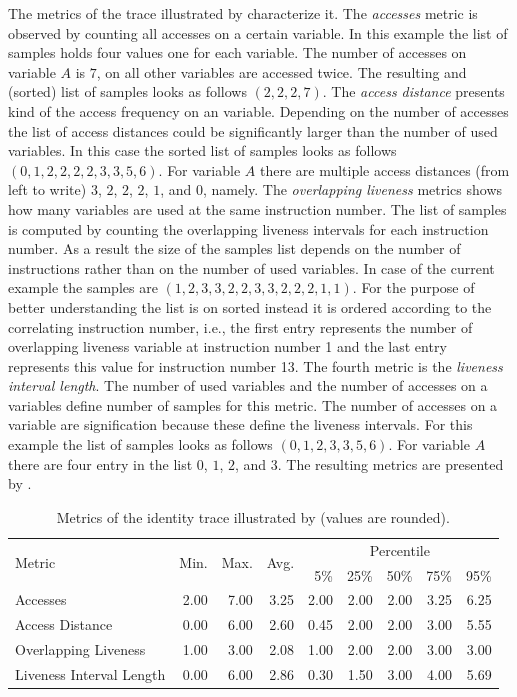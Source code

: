 \documentclass[onecolumn, openright, master, english, signatures]{dbrgrptt}
\begin{document}
The metrics of the \ac{trace} illustrated by  characterize it. The \emph{accesses} metric is observed by counting all accesses on a certain variable. In this example the list of samples holds four values one for each variable. The number of accesses on variable $A$ is $7$, on all other variables are accessed twice. The resulting and (sorted) list of samples looks as follows $(2, 2, 2, 7)$. The \emph{access distance} presents kind of the access frequency on an variable. Depending on the number of accesses the list of access distances could be significantly larger than the number of used variables. In this case the sorted list of samples looks as follows $(0, 1, 2, 2, 2, 2, 3, 3, 5, 6)$. For variable $A$ there are multiple access distances (from left to write) $3$, $2$, $2$, $2$, $1$, and $0$, namely. The \emph{overlapping liveness} metrics shows how many variables are used at the same instruction number. The list of samples is computed by counting the overlapping liveness intervals for each instruction number. As a result the size of the samples list depends on the number of instructions rather than on the number of used variables. In case of the current example the samples are $(1, 2, 3, 3, 2, 2, 3, 3, 2, 2, 2, 1, 1)$. For the purpose of better understanding the list is on sorted instead it is ordered according to the correlating instruction number, i.e., the first entry represents the number of overlapping liveness variable at instruction number 1 and the last entry represents this value for instruction number 13. The fourth metric is the \emph{liveness interval length}. The number of used variables and the number of accesses on a variables define number of samples for this metric. The number of accesses on a variable are signification because these define the liveness intervals. For this example the list of samples looks as follows $(0, 1, 2, 3, 3, 5, 6)$. For variable $A$ there are four entry in the list $0$, $1$, $2$, and $3$. The resulting metrics are presented by .

\begin{table}[!ht]
  \centering
  \begin{tabular}{lrrrrrrrr}
    \hline
    \multirow{2}{*}{Metric} & \multirow{2}{*}{Min.} & \multirow{2}{*}{Max.} & \multirow{2}{*}{Avg.} & \multicolumn{5}{c}{Percentile} \tabularnewline
    & & & & 5\% & 25\% & 50\% & 75\% & 95\% \tabularnewline
    \hline
    Accesses                 & 2.00 & 7.00 & 3.25 & 2.00 & 2.00 & 2.00 & 3.25 & 6.25 \\
    Access Distance          & 0.00 & 6.00 & 2.60 & 0.45 & 2.00 & 2.00 & 3.00 & 5.55 \\
    Overlapping Liveness     & 1.00 & 3.00 & 2.08 & 1.00 & 2.00 & 2.00 & 3.00 & 3.00 \\
    Liveness Interval Length & 0.00 & 6.00 & 2.86 & 0.30 & 1.50 & 3.00 & 4.00 & 5.69 \\
    \hline
  \end{tabular}
  \caption{Metrics of the identity \ac{trace} illustrated by  (values are rounded).}
  \label{tab:summarizing-example-metrics-original}
\end{table}
\end{document}
